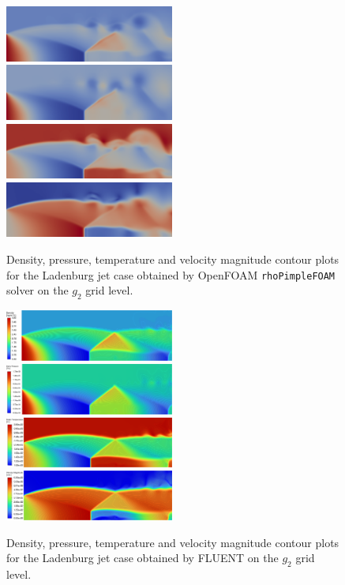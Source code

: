 \documentclass[12pt]{article}
\begin{document}
\begin{figure}[H]
  \centering
  \includegraphics[width=0.495\textwidth]{figs/rhoPimpleFoam/rho.png}
  \includegraphics[width=0.495\textwidth]{figs/rhoPimpleFoam/p.png}\\
  \includegraphics[width=0.495\textwidth]{figs/rhoPimpleFoam/T.png}
  \includegraphics[width=0.495\textwidth]{figs/rhoPimpleFoam/U.png}
  \caption{Density, pressure, temperature and velocity magnitude contour plots for the Ladenburg jet case obtained by OpenFOAM \texttt{rhoPimpleFOAM} solver on the $g_2$ grid level.}
  \label{fig:OFPimpleplots}
\end{figure}

\begin{figure}[H]
  \centering
  \includegraphics[width=0.495\textwidth]{figs/fluent_rho2.png}
  \includegraphics[width=0.495\textwidth]{figs/fluent_p2.png}\\
  \includegraphics[width=0.495\textwidth]{figs/fluent_T2.png}
  \includegraphics[width=0.495\textwidth]{figs/fluent_v2.png}
  \caption{Density, pressure, temperature and velocity magnitude contour plots for the Ladenburg jet case obtained by FLUENT on the $g_2$ grid level.}
  \label{fig:Fplots}
\end{figure}
\end{document}
